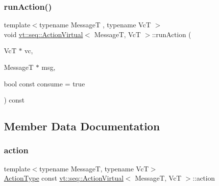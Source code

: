 \mbox{\label{structvt_1_1seq_1_1_action_virtual_a922416441cccf4daf3969d05b57c99b2}} 
\subsubsection{\texorpdfstring{run\+Action()}{runAction()}}
{\footnotesize\ttfamily template$<$typename MessageT , typename VcT $>$ \\
void \hyperlink{structvt_1_1seq_1_1_action_virtual}{vt\+::seq\+::\+Action\+Virtual}$<$ MessageT, VcT $>$\+::run\+Action (\begin{DoxyParamCaption}\item[{VcT $\ast$}]{vc,  }\item[{MessageT $\ast$}]{msg,  }\item[{bool const}]{consume = {\ttfamily true} }\end{DoxyParamCaption}) const}



\subsection{Member Data Documentation}
\mbox{\label{structvt_1_1seq_1_1_action_virtual_a438e5137b43bd3b61f8125ce55561d71}} 
\subsubsection{\texorpdfstring{action}{action}}
{\footnotesize\ttfamily template$<$typename MessageT, typename VcT$>$ \\
\hyperlink{structvt_1_1seq_1_1_action_virtual_a878b5933c67038a3b6e27aaa218693aa}{Action\+Type} const \hyperlink{structvt_1_1seq_1_1_action_virtual}{vt\+::seq\+::\+Action\+Virtual}$<$ MessageT, VcT $>$\+::action}

\mbox{\label{structvt_1_1seq_1_1_action_virtual_a24673f64e37cb0cc1d424cfe3defb606}} 
